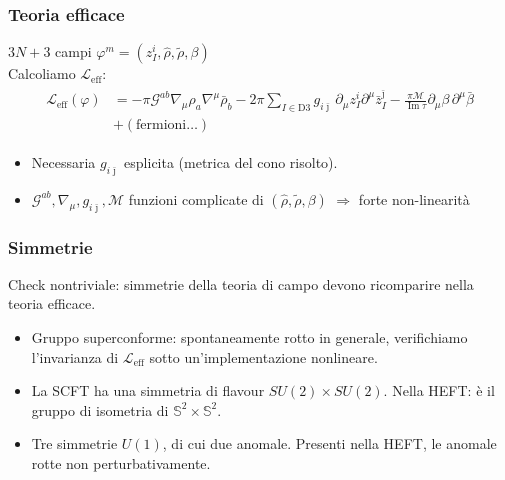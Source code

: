 \documentclass[aspectratio=43,mathserif]{beamer}
\newcommand{\ess}{\mathbb{S}}
\newcommand{\ssn}{\mathcal{N}}
\newcommand{\hatt}[1]{\ensuremath{\widehat{#1}}}
\newcommand{\tildd}[1]{\ensuremath{\widetilde{#1}}}
\renewcommand{\Im}{\ensuremath{\operatorname{Im}}}
\newcommand{\leff}{\ensuremath{\mathcal{L}_\text{eff}}}
\begin{document}
\begin{frame}
	\frametitle{Teoria efficace}
	$3N+3$ campi $\varphi^m = (z_I^i, \hatt\rho, \tildd\rho, \beta)$\\
	\vfill Calcoliamo $\leff$:
	\vspace{10pt}
	\begin{align}
		\begin{split}
			\leff(\varphi) &= - \pi \mathcal{G}^{ab} \nabla_\mu \rho_a \nabla^\mu \bar\rho_b - 2\pi \sum_{I\in \text{D3}} g_{i\bar\jmath}\, \partial_\mu z_I^i \partial^\mu \bar z_I^{\bar\jmath} - \frac{\pi\mathcal{M}}{\Im \tau} \partial_\mu \beta \,\partial^\mu \bar\beta\\
		&+ \left( \text{fermioni}\ldots \right)
	\end{split}
	\end{align}
	\vspace{-10pt}

	\begin{itemize}
		\item Necessaria $g_{i\bar\jmath}$ esplicita (metrica del cono risolto).
		\vfill \item $\mathcal{G}^{ab},\nabla_\mu,g_{i\bar\jmath},\mathcal{M}$ funzioni complicate di $(\hatt\rho,\tildd\rho,\beta)$ $\Longrightarrow$ forte non-linearità
	\end{itemize}



\end{frame}


\begin{frame}
	\frametitle{Simmetrie}
	Check nontriviale: simmetrie della teoria di campo devono ricomparire nella teoria efficace. 
	\begin{itemize}
		\vfill\item Gruppo superconforme: spontaneamente rotto in generale, verifichiamo l'invarianza di $\leff$ sotto un'implementazione nonlineare.
		\vfill\item La SCFT ha una simmetria di flavour $SU(2)\times SU(2)$. Nella HEFT: è il gruppo di isometria di $\ess^2 \times \ess^2$.
		\vfill\item Tre simmetrie $U(1)$, di cui due anomale. Presenti nella HEFT, le anomale rotte non perturbativamente.
	\end{itemize}
\end{frame}
\end{document}
